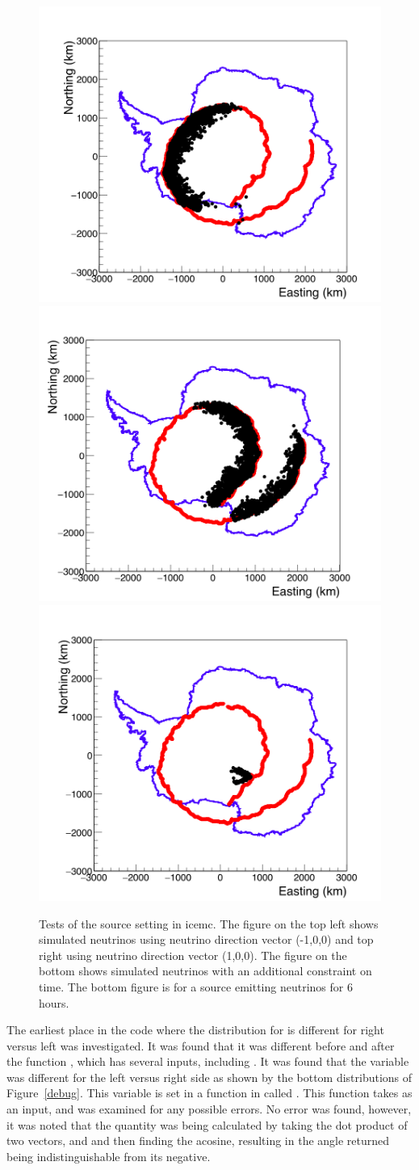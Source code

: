 \begin{figure}
\centering
\includegraphics[width=.49\textwidth]{figures/source_test_using_nnu-100.png}
\includegraphics[width=.49\textwidth]
{figures/source_test_using_nnu100.png}
\includegraphics[width=.49\textwidth]
{figures/source_test_using_nnu100_time_cut_6hrs.png}
\caption{Tests of the source setting in icemc. The figure on the top left shows simulated neutrinos using neutrino direction vector (-1,0,0) and top right using neutrino direction vector (1,0,0). The figure on the bottom shows simulated neutrinos with an additional constraint on time. The bottom figure is for a source emitting neutrinos for 6 hours.}
\label{source_tests}
\end{figure}

The earliest place in the code where the distribution for  is different for right versus left was investigated. 
It was found that it was different before and after the function , which has several inputs, including . 
It was found that the variable  was different for the left versus right side as shown by the bottom distributions of Figure~\ref{debug}. This variable is set in a function in  called . This function takes  as an input, and was examined for any possible errors. No error was found, however, it was noted that the quantity  was being calculated by taking the dot product of two vectors,  and  and then finding the acosine, resulting in the angle returned being indistinguishable from its negative. 

